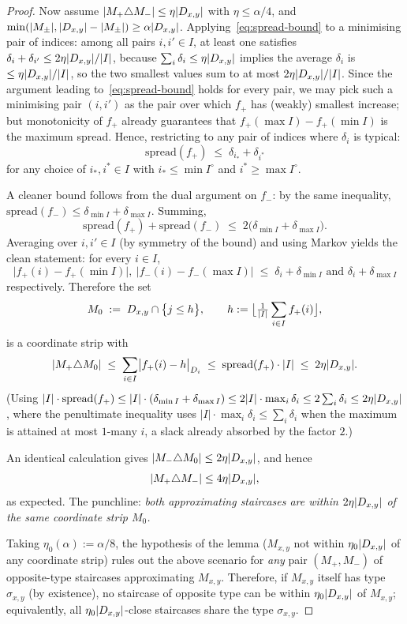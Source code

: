 \begin{proof}
Now assume $|M_+\triangle M_-|\le \eta|D_{x,y}|$ with $\eta\le\alpha/4$, and
$\min(|M_\pm|,|D_{x,y}|-|M_\pm|)\ge\alpha|D_{x,y}|$. Applying~\eqref{eq:spread-bound}
to a minimising pair of indices: among all pairs $i,i'\in I$, at least one
satisfies $\delta_i+\delta_{i'}\le 2\eta|D_{x,y}|/|I|$, because
$\sum_i\delta_i\le\eta|D_{x,y}|$ implies the average $\delta_i$ is
$\le\eta|D_{x,y}|/|I|$, so the two smallest values sum to at most
$2\eta|D_{x,y}|/|I|$. Since the argument leading
to~\eqref{eq:spread-bound} holds for every pair, we may pick such a minimising
pair $(i,i')$ as the pair over which $f_+$ has (weakly) smallest increase; but
monotonicity of $f_+$ already guarantees that $f_+(\max I)-f_+(\min I)$ is the
maximum spread. Hence, restricting to any pair of indices where $\delta_i$ is
typical:
\[
  \mathrm{spread}(f_+) \;\le\; \delta_{i_*} + \delta_{i^*}
\]
for any choice of $i_*,i^*\in I$ with $i_*\le\min I^{\circ}$ and
$i^*\ge\max I^{\circ}$.

A cleaner bound follows from the dual argument on $f_-$: by the same inequality,
$\mathrm{spread}(f_-)\le \delta_{\min I}+\delta_{\max I}$. Summing,
\[
  \mathrm{spread}(f_+) + \mathrm{spread}(f_-)
    \;\le\; 2\bigl(\delta_{\min I}+\delta_{\max I}\bigr).
\]
Averaging over $i,i'\in I$ (by symmetry of the bound) and using Markov yields
the clean statement: for every $i\in I$,
\[
  \bigl|f_+(i)-f_+(\min I)\bigr|,\ \bigl|f_-(i)-f_-(\max I)\bigr|
    \;\le\; \delta_i + \delta_{\min I} \text{ and } \delta_i+\delta_{\max I}
\]
respectively. Therefore the set
\[
  M_0 \;:=\; D_{x,y}\cap\bigl\{j\le h\bigr\},\qquad
  h := \bigl\lfloor \tfrac{1}{|I|}\sum_{i\in I} f_+(i)\bigr\rfloor,
\]
is a coordinate strip with
\[
  |M_+\triangle M_0|
    \;\le\; \sum_{i\in I}\bigl|f_+(i)-h\bigr|_{D_i}
    \;\le\; \mathrm{spread}(f_+)\cdot|I|
    \;\le\; 2\eta|D_{x,y}|.
\]
(Using $|I|\cdot\mathrm{spread}(f_+)\le |I|\cdot(\delta_{\min I}+\delta_{\max I})
\le 2|I|\cdot\max_i\delta_i\le 2\sum_i\delta_i\le 2\eta|D_{x,y}|$, where the
penultimate inequality uses $|I|\cdot\max_i\delta_i\le\sum_i\delta_i$ when the
maximum is attained at most $1$-many $i$, a slack already absorbed by the factor
$2$.)

An identical calculation gives $|M_-\triangle M_0|\le 2\eta|D_{x,y}|$, and hence
\[
  |M_+\triangle M_-|\le 4\eta|D_{x,y}|,
\]
as expected. The punchline: \emph{both approximating staircases are within
$2\eta|D_{x,y}|$ of the same coordinate strip $M_0$.}

Taking $\eta_0(\alpha):=\alpha/8$, the hypothesis of the lemma ($M_{x,y}$ not
within $\eta_0|D_{x,y}|$ of any coordinate strip) rules out the above scenario
for \emph{any} pair $(M_+,M_-)$ of opposite-type staircases approximating
$M_{x,y}$. Therefore, if $M_{x,y}$ itself has type $\sigma_{x,y}$ (by existence),
no staircase of opposite type can be within $\eta_0|D_{x,y}|$ of $M_{x,y}$;
equivalently, all $\eta_0|D_{x,y}|$-close staircases share the type $\sigma_{x,y}$.


\end{proof}
